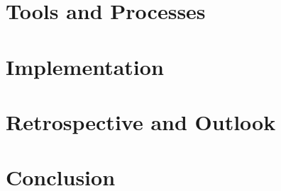 \documentclass{clbthesis}
\begin{document}
\chapter{Tools and Processes}					


\chapter{Implementation}						


\chapter{Retrospective and Outlook} 			


\chapter{Conclusion}				




\cleardoublepage
{}
{}\listoffigures

\listoftables


\appendix



% 
\end{document}
